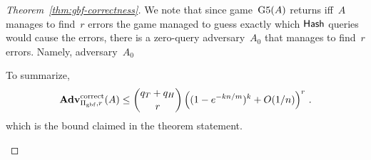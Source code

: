 \begin{proof}[Theorem~\ref{thm:gbf-correctness}]
We note that since game~$\text{G5}(A)$ returns iff~$A$ manages to find~$r$ errors the game managed to guess exactly which $\mathsf{Hash}$ queries would cause the errors, there is a zero-query adversary~$A_0$ that manages to find~$r$ errors. Namely, adversary~$A_0$ 


To summarize, 
\[
\mathrm{\mathbf{Adv}}^{\mathrm{correct}}_{\Pi_{\mathrm{gbf}},r}(A) \leq  {\dbinom{q_T + q_H}{r}} \left( (1-e^{-kn/m})^k + O(1/n) \right)^r\,.
\]
which is the bound claimed in the theorem statement.
\begin{figure}[tp]
\end{figure}
\end{proof}
